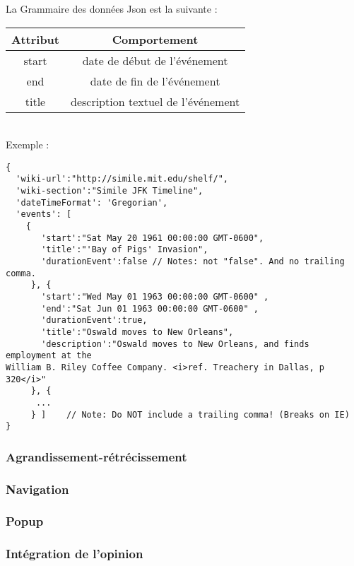 \documentclass[10pt,a4paper]{article}
\begin{document}
La Grammaire des données Json est la suivante :\\
\begin{tabular}{|c|c|}
\hline 
Attribut & Comportement \\ 
\hline 
start & date de début de l’événement \\ 
\hline 
end & date de fin de l'événement \\ 
\hline 
title & description textuel de l’événement \\ 
\hline 
\end{tabular}  
\\
Exemple : 
\begin{verbatim}
{ 
  'wiki-url':"http://simile.mit.edu/shelf/", 
  'wiki-section':"Simile JFK Timeline", 
  'dateTimeFormat': 'Gregorian',
  'events': [
    {
       'start':"Sat May 20 1961 00:00:00 GMT-0600",
       'title':"'Bay of Pigs' Invasion",
       'durationEvent':false // Notes: not "false". And no trailing comma.
     }, {
       'start':"Wed May 01 1963 00:00:00 GMT-0600" ,
       'end':"Sat Jun 01 1963 00:00:00 GMT-0600" ,
       'durationEvent':true,
       'title':"Oswald moves to New Orleans",
       'description':"Oswald moves to New Orleans, and finds employment at the
William B. Riley Coffee Company. <i>ref. Treachery in Dallas, p 320</i>"
     }, {
      ...
     } ]    // Note: Do NOT include a trailing comma! (Breaks on IE)
}
\end{verbatim}

\subsubsection{Agrandissement-rétrécissement}
\subsubsection{Navigation}
\subsubsection{Popup}
\subsubsection{Intégration de l'opinion}
\end{document}
